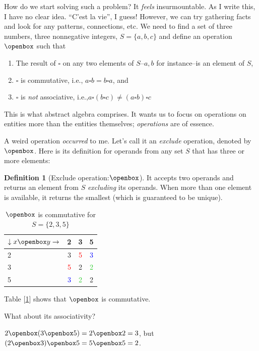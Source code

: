 \documentclass[english,notitlepage,smartquotes]{hgbreport}
\theoremstyle{definition}
\newtheorem{definition}{Definition}
\theoremstyle{definition}
\theoremstyle{remark}
\theoremstyle{plain}
\theoremstyle{definition}
\theoremstyle{definition}
\begin{document}
How do we start solving such a problem? It \emph{feels} insurmountable. As I write this, I have no clear idea. ``C’est la vie'', I guess! However, we can try gathering facts and look for any patterns, connections, etc. We need to find a set of three numbers, three nonnegative integers, $S=\{a,b,c\}$ and define an operation $\openbox$ such that
\begin{enumerate}
\item The result of $\square$ on any two elements of $S$--$a,b$ for instance--is an element of $S$,
\item $\square$ is commutative, i.e., $a\square b= b\square a$, and
\item $\square$ is \emph{not} associative, i.e.,$a\square(b\square c)\ne (a\square b)\square c$
\end{enumerate}

This is what abstract algebra comprises. It wants us to focus on operations on entities more than the entities themselves; \emph{operations} are of essence.

A weird operation \emph{occurred} to me. Let's call it an \emph{exclude} operation, denoted by $\openbox$. Here is its definition for operands from any set $S$ that has three or more elements:

\begin{definition}[Exclude operation:$\openbox$]
It accepts two operands and returns an element from $S$ \emph{excluding} its operands. When more than one element is available, it returns the smallest (which is guaranteed to be unique).
\end{definition}

\begin{table}[h!]
\centering
\begin{tabular}{l|ccc}
$\downarrow x\openbox y\rightarrow$&2&3&5\\
\hline
2&3&{\textcolor{red}5}&{\textcolor{blue}3}\\
3&{\textcolor{red}5}&2&{\textcolor{LimeGreen}2}\\
5&{\textcolor{blue}3}&{\textcolor{LimeGreen}2}&2\\
\end{tabular}
\caption{$\openbox$ is commutative for $S=\{2,3,5\}$}
\label{tab:exclude}
\end{table}

Table [\ref{tab:exclude}] shows that $\openbox$ is commutative.

What about its associativity? 

$2\openbox(3\openbox 5)=2\openbox 2=3$, but $(2\openbox 3)\openbox 5=5\openbox 5=2$.
\end{document}
